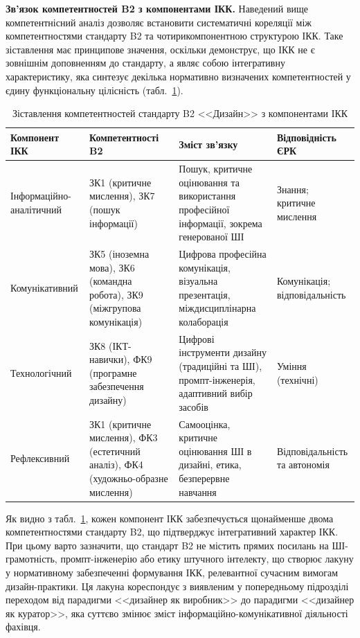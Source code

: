 \textbf{Зв'язок компетентностей B2 з компонентами ІКК.} Наведений вище компетентнісний аналіз дозволяє встановити систематичні кореляції між компетентностями стандарту B2 та чотирикомпонентною структурою ІКК. Таке зіставлення має принципове значення, оскільки демонструє, що ІКК не є зовнішнім доповненням до стандарту, а являє собою інтегративну характеристику, яка синтезує декілька нормативно визначених компетентностей у єдину функціональну цілісність (табл.~\ref{tab:b2-ikk-mapping}).

\begin{table}[htbp]
\caption{Зіставлення компетентностей стандарту B2 <<Дизайн>> з компонентами ІКК}
\label{tab:b2-ikk-mapping}
\centering\small
\begin{tabularx}{\textwidth}{@{}p{2.8cm}p{3.2cm}Xp{2.5cm}@{}}
\toprule
\textbf{Компонент ІКК} & \textbf{Компетентності B2} & \textbf{Зміст зв'язку} & \textbf{Відповідність ЄРК} \\
\midrule
Інформаційно-аналітичний & ЗК1 (критичне мислення), ЗК7 (пошук інформації) & Пошук, критичне оцінювання та використання професійної інформації, зокрема генерованої ШІ & Знання; критичне мислення \\
\addlinespace
Комунікативний & ЗК5 (іноземна мова), ЗК6 (командна робота), ЗК9 (міжгрупова комунікація) & Цифрова професійна комунікація, візуальна презентація, міждисциплінарна колаборація & Комунікація; відповідальність \\
\addlinespace
Технологічний & ЗК8 (ІКТ-навички), ФК9 (програмне забезпечення дизайну) & Цифрові інструменти дизайну (традиційні та ШІ), промпт-інженерія, адаптивний вибір засобів & Уміння (технічні) \\
\addlinespace
Рефлексивний & ЗК1 (критичне мислення), ФК3 (естетичний аналіз), ФК4 (художньо-образне мислення) & Самооцінка, критичне оцінювання ШІ в дизайні, етика, безперервне навчання & Відповідальність та автономія \\
\bottomrule
\end{tabularx}
\end{table}

Як видно з табл.~\ref{tab:b2-ikk-mapping}, кожен компонент ІКК забезпечується щонайменше двома компетентностями стандарту B2, що підтверджує інтегративний характер ІКК. При цьому варто зазначити, що стандарт B2 не містить прямих посилань на ШІ-грамотність, промпт-інженерію або етику штучного інтелекту, що створює лакуну у нормативному забезпеченні формування ІКК, релевантної сучасним вимогам дизайн-практики. Ця лакуна кореспондує з виявленим у попередньому підрозділі переходом від парадигми <<дизайнер як виробник>> до парадигми <<дизайнер як куратор>>, яка суттєво змінює зміст інформаційно-комунікативної діяльності фахівця.


